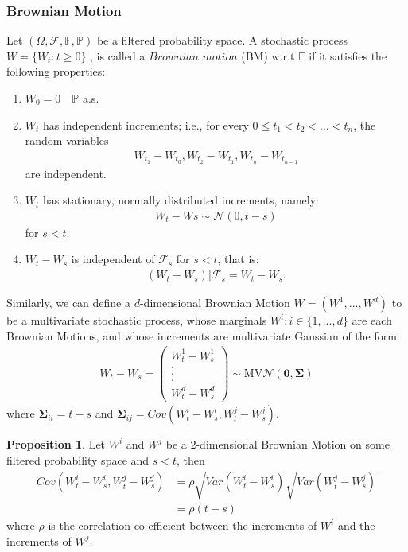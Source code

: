 \documentclass{article}
\theoremstyle{definition}
\newtheorem{proposition}{Proposition}
\begin{document}
\subsubsection{Brownian Motion}
Let $(\Omega, \mathcal{F}, \mathbb{F}, \mathbb{P})$ be a filtered probability space. A stochastic process $W = \{W_{t} : t\geq 0\}$ , is called a $\textit{Brownian motion}$ (BM) w.r.t $\mathbb{F}$ if it satisfies the following properties:
\begin{enumerate}
\item $W_{0} = 0 \quad \mathbb{P}$ a.s.
\item $W_{t}$ has independent increments; i.e., for every $ 0 \leq t_1 < t_2 < \dots < t_n $, the random variables
\begin{align}
    W_{t_{1}} -W_{t_{0}},W_{t_{2}} -W_{t_{1}},W_{t_{n}} -W_{t_{n-1}} 
\end{align}
are independent.
\item $W_{t}$ has stationary, normally distributed increments, namely: 
\begin{align}
    W_{t}-W{s} \sim \mathcal{N}(0, t-s)
\end{align}
for $s<t$.
\item $W_{t} - W_{s}$ is independent of $\mathcal{F}_{s}$ for $s<t$, that is:
\begin{align}
    \left(W_{t} - W_{s}\right)|\mathcal{F}_{s} = W_{t} - W_{s}.
\end{align}
\end{enumerate}
Similarly, we can define a $d$-dimensional Brownian Motion $W=(W^1,...,W^d)$ to be a multivariate stochastic process, whose marginals $W^i: i\in \{1,...,d\}$ are each Brownian Motions, and whose increments are multivariate Gaussian of the form: 
\begin{align}
    W_t-W_s = \left(\begin{matrix}
        W^1_t-W^1_s\\
        .\\
        .\\
        .\\
        W^d_t-W^d_s
    \end{matrix}\right) \sim \text{MV}\mathcal{N}(\mathbf{0},\boldsymbol{\Sigma})
\end{align}
where $\boldsymbol{\Sigma}_{ii}=t-s$ and $\boldsymbol{\Sigma}_{ij}=Cov(W_t^i-W_s^i,W_t^j-W_s^j)$.

\begin{proposition}
\label{COV BM}
Let $W^i$ and $W^j$ be a 2-dimensional Brownian Motion on some filtered probability space and $s<t$, then
\begin{align}
Cov(W_t^i-W_s^i,W_t^j-W_s^j) &= \rho \sqrt{Var(W_t^i-W_s^i)}\sqrt{Var(W_t^j-W_s^j)}\\
&=\rho (t-s)
\end{align}
where $\rho$ is the correlation co-efficient between the increments of $W^i$ and the increments of $W^j$.
\end{proposition}
\end{document}
